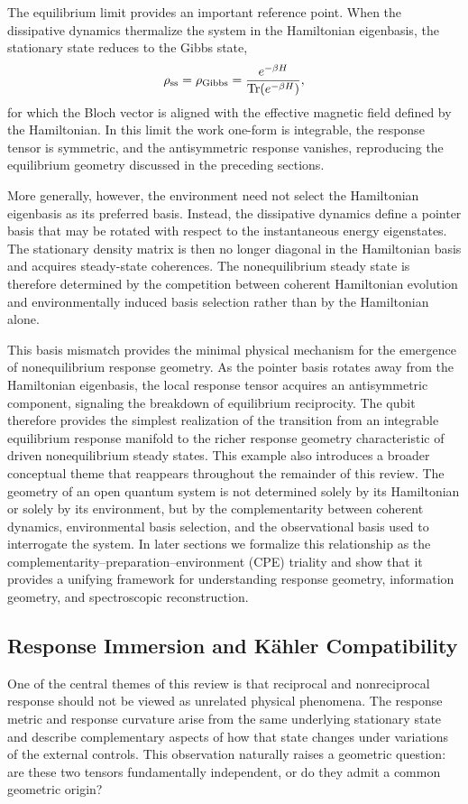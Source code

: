 The equilibrium limit provides an important reference point. When
the dissipative dynamics thermalize the system in the
Hamiltonian eigenbasis, the stationary state reduces to the Gibbs
state,
\begin{align}
\rho_{\rm ss}
=
\rho_{\rm Gibbs}
=
\frac{e^{-\beta H}}
{\mathrm{Tr}(e^{-\beta H})},
\end{align}
for which the Bloch vector is aligned with the effective magnetic
field defined by the Hamiltonian. In this limit the work one-form
is integrable, the response tensor is symmetric, and the
antisymmetric response vanishes, reproducing the equilibrium
geometry discussed in the preceding sections.

More generally, however, the environment need not select the
Hamiltonian eigenbasis as its preferred basis. Instead, the
dissipative dynamics define a pointer basis that may be rotated
with respect to the instantaneous energy eigenstates. The
stationary density matrix is then no longer diagonal in the
Hamiltonian basis and acquires steady-state coherences. The
nonequilibrium steady state is therefore determined by the
competition between coherent Hamiltonian evolution and
environmentally induced basis selection rather than by the
Hamiltonian alone.

This basis mismatch provides the minimal physical mechanism for
the emergence of nonequilibrium response geometry. As the pointer
basis rotates away from the Hamiltonian eigenbasis, the local
response tensor acquires an antisymmetric component, signaling
the breakdown of equilibrium reciprocity. The qubit therefore
provides the simplest realization of the transition from an
integrable equilibrium response manifold to the richer response
geometry characteristic of driven nonequilibrium steady states.
This example also introduces a broader conceptual theme that
reappears throughout the remainder of this review. The geometry
of an open quantum system is not determined solely by its
Hamiltonian or solely by its environment, but by the
complementarity between coherent dynamics, environmental basis
selection, and the observational basis used to interrogate the
system. In later sections we formalize this relationship as the
complementarity--preparation--environment (CPE) triality and show
that it provides a unifying framework for understanding response
geometry, information geometry, and spectroscopic
reconstruction.

\subsection{Response Immersion and K\"ahler Compatibility}
\label{sec:KahlerCompatibility}
One of the central themes of this review is that reciprocal and
nonreciprocal response should not be viewed as unrelated physical
phenomena. The response metric and response curvature arise from
the same underlying stationary state and describe complementary
aspects of how that state changes under variations of the external
controls. This observation naturally raises a geometric question:
are these two tensors fundamentally independent, or do they admit
a common geometric origin?

